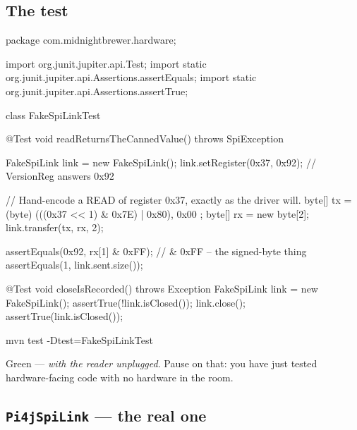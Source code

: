 \subsection{The test}

\begin{jcode}
package com.midnightbrewer.hardware;

import org.junit.jupiter.api.Test;
import static org.junit.jupiter.api.Assertions.assertEquals;
import static org.junit.jupiter.api.Assertions.assertTrue;

class FakeSpiLinkTest {

    @Test
    void readReturnsTheCannedValue() throws SpiException {
        FakeSpiLink link = new FakeSpiLink();
        link.setRegister(0x37, 0x92);          // VersionReg answers 0x92

        // Hand-encode a READ of register 0x37, exactly as the driver will.
        byte[] tx = { (byte) (((0x37 << 1) & 0x7E) | 0x80), 0x00 };
        byte[] rx = new byte[2];
        link.transfer(tx, rx, 2);

        assertEquals(0x92, rx[1] & 0xFF);      // & 0xFF -- the signed-byte thing
        assertEquals(1, link.sent.size());
    }

    @Test
    void closeIsRecorded() throws Exception {
        FakeSpiLink link = new FakeSpiLink();
        assertTrue(!link.isClosed());
        link.close();
        assertTrue(link.isClosed());
    }
}
\end{jcode}

\begin{verifybox}
\begin{shell}
mvn test -Dtest=FakeSpiLinkTest
\end{shell}
Green --- \emph{with the reader unplugged}. Pause on that: you have just tested
hardware-facing code with no hardware in the room.
\end{verifybox}

\subsection{\texttt{Pi4jSpiLink} --- the real one}

